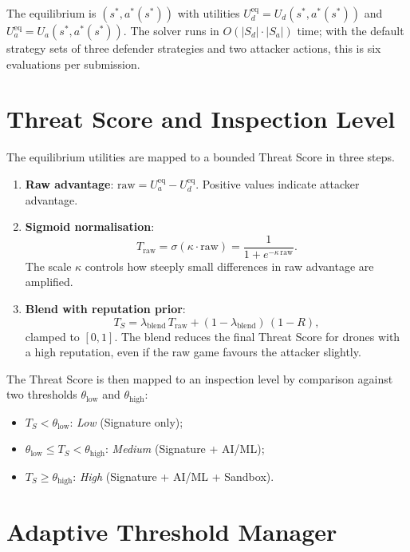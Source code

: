 \documentclass[12pt, a4paper]{report}
\begin{document}
The equilibrium is $(s^*, a^*(s^*))$ with utilities
$U_d^{\text{eq}} = U_d(s^*, a^*(s^*))$ and
$U_a^{\text{eq}} = U_a(s^*, a^*(s^*))$.
The solver runs in $O(|S_d| \cdot |S_a|)$ time; with the default
strategy sets of three defender strategies and two attacker actions,
this is six evaluations per submission.

\section{Threat Score and Inspection Level}

The equilibrium utilities are mapped to a bounded Threat Score in three
steps.

\begin{enumerate}
    \item \textbf{Raw advantage}: $\text{raw} = U_a^{\text{eq}} - U_d^{\text{eq}}$.
          Positive values indicate attacker advantage.
    \item \textbf{Sigmoid normalisation}:
          \[
          T_{\text{raw}} = \sigma(\kappa \cdot \text{raw}) = \frac{1}{1 + e^{-\kappa \, \text{raw}}}.
          \]
          The scale $\kappa$ controls how steeply small differences in
          raw advantage are amplified.
    \item \textbf{Blend with reputation prior}:
          \[
          T_S = \lambda_{\text{blend}} \, T_{\text{raw}} + (1 - \lambda_{\text{blend}})\,(1 - R),
          \]
          clamped to $[0, 1]$. The blend reduces the final Threat Score
          for drones with a high reputation, even if the raw game
          favours the attacker slightly.
\end{enumerate}

The Threat Score is then mapped to an inspection level by comparison
against two thresholds $\theta_{\text{low}}$ and $\theta_{\text{high}}$:
\begin{itemize}
    \item $T_S < \theta_{\text{low}}$: \emph{Low} (Signature only);
    \item $\theta_{\text{low}} \leq T_S < \theta_{\text{high}}$:
          \emph{Medium} (Signature + AI/ML);
    \item $T_S \geq \theta_{\text{high}}$: \emph{High}
          (Signature + AI/ML + Sandbox).
\end{itemize}

\section{Adaptive Threshold Manager}
\end{document}
